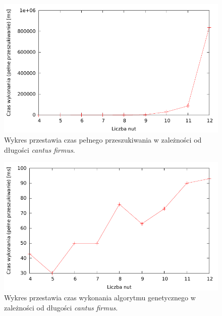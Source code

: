 \documentclass{article}
\begin{document}
\begin{figure}[htb]
\centering
\includegraphics[width=1.0\textwidth]{images/liczba_nut_a_czas_FS.pdf}
\caption{Wykres przestawia czas pełnego przeszukiwania w zależności od długości \emph{cantus firmus}.}
\label{fig:liczba_nut_a_czas_FS}
\end{figure}

\begin{figure}[htb]
\centering
\includegraphics[width=1.0\textwidth]{images/liczba_nut_a_czas_AG.pdf}
\caption{Wykres przestawia czas wykonania algorytmu genetycznego w zależności od długości \emph{cantus firmus}.}
\label{fig:liczba_nut_a_czas_AG}
\end{figure}
\end{document}
